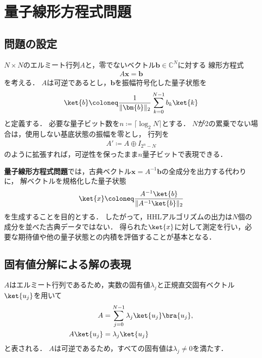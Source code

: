 \section{量子線形方程式問題}
\label{sec:quantum-linear-system-problem}

\subsection{問題の設定}
\label{subsec:qlsp-formulation}

$N\times N$のエルミート行列$A$と，零でないベクトル$\bm{b}\in\mathbb{C}^{N}$に対する
線形方程式
\begin{align*}
  A\bm{x}=\bm{b}
\end{align*}
を考える．
$A$は可逆であるとし，$\bm{b}$を振幅符号化した量子状態を
\begin{equation}
  \ket{b}
  \coloneq
  \frac{1}{\|\bm{b}\|_2}
  \sum_{k=0}^{N-1}b_k\ket{k}
  \label{eq:qlsp-input-state}
\end{equation}
と定義する．
必要な量子ビット数を$n\coloneq\lceil\log_2N\rceil$とする．
$N$が2の累乗でない場合は，使用しない基底状態の振幅を零とし，
行列を
\begin{align*}
  A'
  \coloneq
  A\oplus I_{2^n-N}
\end{align*}
のように拡張すれば，可逆性を保ったまま$n$量子ビットで表現できる．

\textbf{量子線形方程式問題}では，古典ベクトル$\bm{x}=A^{-1}\bm{b}$の全成分を出力する代わりに，
解ベクトルを規格化した量子状態
\begin{equation}
  \ket{x}
  \coloneq
  \frac{A^{-1}\ket{b}}
       {\|A^{-1}\ket{b}\|_2}
  \label{eq:qlsp-solution-state}
\end{equation}
を生成することを目的とする\cite{shimada2020}．
したがって，HHLアルゴリズムの出力は$N$個の成分を並べた古典データではない．
得られた$\ket{x}$に対して測定を行い，必要な期待値や他の量子状態との内積を評価することが基本となる．

\subsection{固有値分解による解の表現}
\label{subsec:eigendecomposition-of-solution}

$A$はエルミート行列であるため，実数の固有値$\lambda_j$と正規直交固有ベクトル$\ket{u_j}$を用いて
\begin{align}
  A
  &=
  \sum_{j=0}^{N-1}\lambda_j\ket{u_j}\bra{u_j},
  \label{eq:a-spectral-decomposition}\\
  A\ket{u_j}
  &=
  \lambda_j\ket{u_j}
  \label{eq:a-eigenvalue-equation}
\end{align}
と表される．
$A$は可逆であるため，すべての固有値は$\lambda_j\neq0$を満たす．

